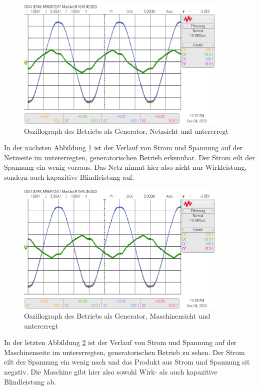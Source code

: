 \documentclass{report}
\begin{document}
\begin{figure}[!ht]
	\centering
	\includegraphics[width=0.9\textwidth]{./assets/img/synchronisation_netz_generator_ue_vzp.png}
	\caption{Oszillograph des Betriebs als Generator, Netzsicht und untererregt}
	\label{fig:sngu}
\end{figure}

In der nächsten Abbildung \ref{fig:sngu} ist der Verlauf von Strom und Spannung auf der Netzseite im untererregten, generatorischen Betrieb erkennbar. Der Strom eilt der Spannung ein wenig vorraus. Das Netz nimmt hier also nicht nur Wirkleistung, sondern auch kapazitive Blindleistung auf.

\begin{figure}[!ht]
	\centering
	\includegraphics[width=0.9\textwidth]{./assets/img/synchronisation_maschine_generator_ue_vzp.png}
	\caption{Oszillograph des Betriebs als Generator, Maschinensicht und untererregt}
	\label{fig:smgu}
\end{figure}

In der letzten Abbildung \ref{fig:smgu} ist der Verlauf von Strom und Spannung auf der Maschinenseite im untererregten, generatorischen Betrieb zu sehen. Der Strom eilt der Spannung ein wenig nach und das Produkt aus Strom und Spannung sit negativ. Die Maschine gibt hier also sowohl Wirk- als auch kapazitive Blindleistung ab.
\end{document}
